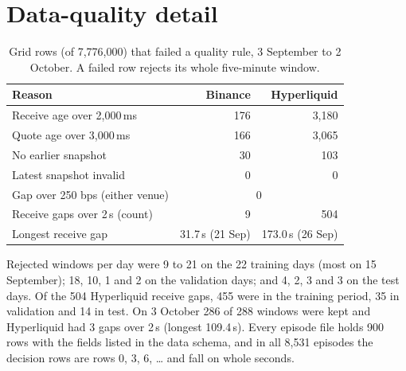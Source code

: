 \documentclass[12pt,a4paper]{article}
\DeclareRobustCommand{\bps}{\ifmmode\,\text{bps}\else\,bps\fi}
\begin{document}
\section{Data-quality detail}\label{app:quality}
\begin{table}[H]
\centering
\caption{Grid rows (of 7,776,000) that failed a quality rule, 3 September to 2 October.
A failed row rejects its whole five-minute window.}
\label{tab:quality}
\begin{tabular}{@{}lrr@{}}
\toprule
Reason & Binance & Hyperliquid \\
\midrule
Receive age over 2,000\,ms & 176 & 3,180 \\
Quote age over 3,000\,ms & 166 & 3,065 \\
No earlier snapshot & 30 & 103 \\
Latest snapshot invalid & 0 & 0 \\
\midrule
Gap over 250\bps{} (either venue) & \multicolumn{2}{c}{0} \\
Receive gaps over 2\,s (count) & 9 & 504 \\
Longest receive gap & 31.7\,s (21 Sep) & 173.0\,s (26 Sep) \\
\bottomrule
\end{tabular}
\end{table}
Rejected windows per day were 9 to 21 on the 22 training days (most on 15 September); 18, 10,
1 and 2 on the validation days; and 4, 2, 3 and 3 on the test days. Of the 504 Hyperliquid
receive gaps, 455 were in the training period, 35 in validation and 14 in test. On 3 October
286 of 288 windows were kept and Hyperliquid had 3 gaps over 2\,s (longest 109.4\,s). Every
episode file holds 900 rows with the fields listed in the data schema, and in all 8,531
episodes the decision rows are rows 0, 3, 6, \ldots{} and fall on whole seconds.
\end{document}
